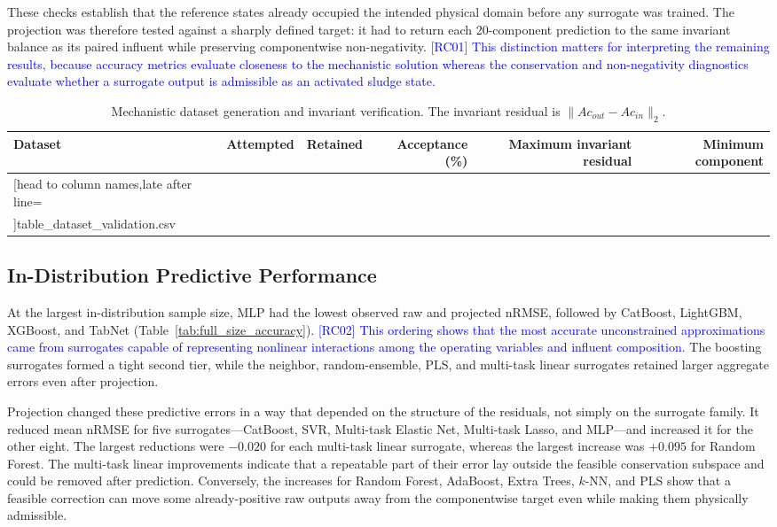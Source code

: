 \documentclass[a4paper,fleqn]{cas-sc}
\newcommand{\rccite}[2]{\textcolor{blue}{[#1] #2}}
\newcommand{\csvrowssix}[1]{%
  \csvreader[head to column names,late after line=\\]{#1}{}{\colA & \colB & \colC & \colD & \colE & \colF}}
\begin{document}
These checks establish that the reference states already occupied the intended physical domain before any surrogate was trained. The projection was therefore tested against a sharply defined target: it had to return each 20-component prediction to the same invariant balance as its paired influent while preserving componentwise non-negativity. \rccite{RC01}{This distinction matters for interpreting the remaining results, because accuracy metrics evaluate closeness to the mechanistic solution whereas the conservation and non-negativity diagnostics evaluate whether a surrogate output is admissible as an activated sludge state.}

\FloatBarrier
\begin{table}[H]
\centering
\caption{Mechanistic dataset generation and invariant verification. The invariant residual is $\|Ac_{out}-Ac_{in}\|_2$.}
\label{tab:dataset_validation}
\scriptsize
\begin{tabular}{lrrrrr}
\toprule
Dataset & Attempted & Retained & Acceptance (\%) & Maximum invariant residual & Minimum component \\
\midrule
\csvrowssix{table_dataset_validation.csv}
\bottomrule
\end{tabular}
\end{table}

\subsection{In-Distribution Predictive Performance}

At the largest in-distribution sample size, MLP had the lowest observed raw and projected nRMSE, followed by CatBoost, LightGBM, XGBoost, and TabNet (Table~\ref{tab:full_size_accuracy}). \rccite{RC02}{This ordering shows that the most accurate unconstrained approximations came from surrogates capable of representing nonlinear interactions among the operating variables and influent composition.} The boosting surrogates formed a tight second tier, while the neighbor, random-ensemble, PLS, and multi-task linear surrogates retained larger aggregate errors even after projection.

Projection changed these predictive errors in a way that depended on the structure of the residuals, not simply on the surrogate family. It reduced mean nRMSE for five surrogates---CatBoost, SVR, Multi-task Elastic Net, Multi-task Lasso, and MLP---and increased it for the other eight. The largest reductions were $-0.020$ for each multi-task linear surrogate, whereas the largest increase was $+0.095$ for Random Forest. The multi-task linear improvements indicate that a repeatable part of their error lay outside the feasible conservation subspace and could be removed after prediction. Conversely, the increases for Random Forest, AdaBoost, Extra Trees, $k$-NN, and PLS show that a feasible correction can move some already-positive raw outputs away from the componentwise target even while making them physically admissible.
\end{document}
